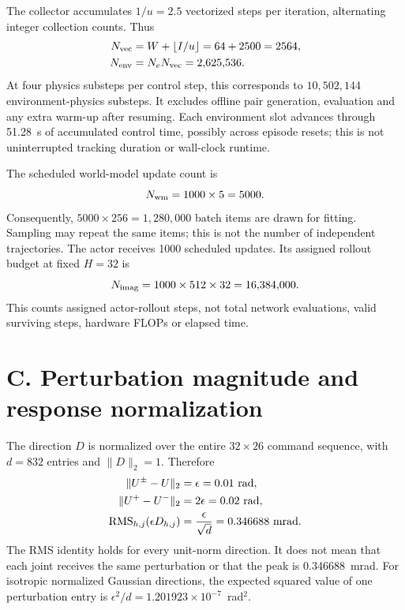 \documentclass[letterpaper,10pt,conference]{ieeeconf}
\begin{document}
The collector accumulates $1/u=2.5$ vectorized steps per iteration, alternating integer collection counts. Thus
\begin{equation}
\begin{aligned}
 N_{\rm vec}&=W+\lfloor I/u\rfloor=64+2500=2564,\\
 N_{\rm env}&=N_e N_{\rm vec}=2{,}625{,}536.
\end{aligned}
\end{equation}
At four physics substeps per control step, this corresponds to $10{,}502{,}144$ environment-physics substeps. It excludes offline pair generation, evaluation and any extra warm-up after resuming. Each environment slot advances through 51.28~s of accumulated control time, possibly across episode resets; this is not uninterrupted tracking duration or wall-clock runtime.

The scheduled world-model update count is
\begin{equation}
 N_{\rm wm}=1000\times5=5000.
\end{equation}
Consequently, $5000\times256=1{,}280{,}000$ batch items are drawn for fitting. Sampling may repeat the same items; this is not the number of independent trajectories. The actor receives 1000 scheduled updates. Its assigned rollout budget at fixed $H=32$ is
\begin{equation}
 N_{\rm imag}=1000\times512\times32=16{,}384{,}000.
\end{equation}
This counts assigned actor-rollout steps, not total network evaluations, valid surviving steps, hardware FLOPs or elapsed time.

\section*{C. Perturbation magnitude and response normalization}
The direction $D$ is normalized over the entire $32\times26$ command sequence, with $d=832$ entries and $\|D\|_2=1$. Therefore
\begin{equation}
\begin{aligned}
 \|U^\pm-U\|_2&=\epsilon=0.01\ \mathrm{rad},\\
 \|U^+-U^-\|_2&=2\epsilon=0.02\ \mathrm{rad},\\
 {\rm RMS}_{h,j}(\epsilon D_{h,j})
 &=\frac{\epsilon}{\sqrt{d}}
 =0.346688\ \mathrm{mrad}.
\end{aligned}
\end{equation}
The RMS identity holds for every unit-norm direction. It does not mean that each joint receives the same perturbation or that the peak is 0.346688~mrad. For isotropic normalized Gaussian directions, the expected squared value of one perturbation entry is $\epsilon^2/d=1.201923\times10^{-7}$~rad$^2$.
\end{document}
